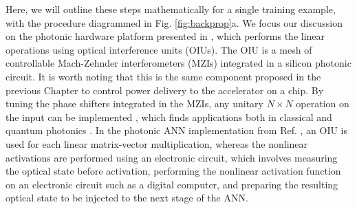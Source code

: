 Here, we will outline these steps mathematically for a single training example, with the procedure diagrammed in Fig. \ref{fig:backprop}a.  We focus our discussion on the photonic hardware platform presented in \cite{Shen2017}, which performs the linear operations using optical interference units (OIUs).  The OIU is a mesh of controllable Mach-Zehnder interferometers (MZIs) integrated in a silicon photonic circuit. It is worth noting that this is the same component proposed in the previous Chapter to control power delivery to the accelerator on a chip.
By tuning the phase shifters integrated in the MZIs, any unitary $N \times N$ operation on the input can be implemented \cite{Reck1994,Clements2016}, which finds applications both in classical and quantum photonics \cite{Carolan2015, Harris2017}.  In the photonic ANN implementation from Ref. \cite{Shen2017}, an OIU is used for each linear matrix-vector multiplication, whereas the nonlinear activations are performed using an electronic circuit, which involves measuring the optical state before activation, performing the nonlinear activation function on an electronic circuit such as a digital computer, and preparing the resulting optical state to be injected to the next stage of the ANN.

